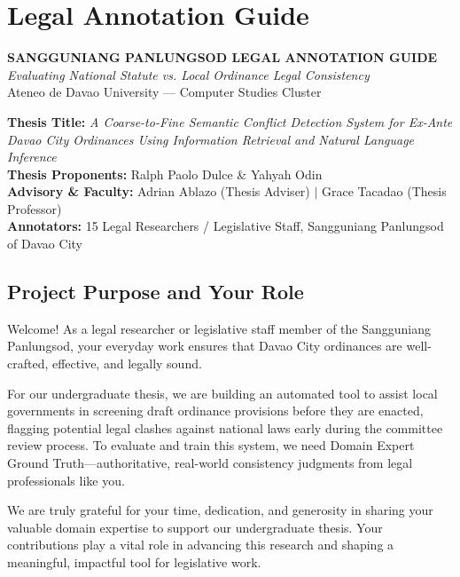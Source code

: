 \chapter{Legal Annotation Guide}
\label{app:annotator_guidebook}

\begin{center}
    \large\textbf{SANGGUNIANG PANLUNGSOD LEGAL ANNOTATION GUIDE}\\
    \normalsize\textit{Evaluating National Statute vs. Local Ordinance Legal Consistency}\\
    \small Ateneo de Davao University --- Computer Studies Cluster
\end{center}

\vspace{0.5em}
\noindent\textbf{Thesis Title:} \textit{A Coarse-to-Fine Semantic Conflict Detection System for Ex-Ante Davao City Ordinances Using Information Retrieval and Natural Language Inference}\\
\textbf{Thesis Proponents:} Ralph Paolo Dulce \& Yahyah Odin\\
\textbf{Advisory \& Faculty:} Adrian Ablazo (Thesis Adviser) $|$ Grace Tacadao (Thesis Professor)\\
\textbf{Annotators:} 15 Legal Researchers / Legislative Staff, Sangguniang Panlungsod of Davao City

\section{Project Purpose and Your Role}
\label{sec:app_guide_purpose}

Welcome! As a legal researcher or legislative staff member of the Sangguniang Panlungsod, your everyday work ensures that Davao City ordinances are well-crafted, effective, and legally sound. 

For our undergraduate thesis, we are building an automated tool to assist local governments in screening draft ordinance provisions before they are enacted, flagging potential legal clashes against national laws early during the committee review process. To evaluate and train this system, we need Domain Expert Ground Truth---authoritative, real-world consistency judgments from legal professionals like you.

We are truly grateful for your time, dedication, and generosity in sharing your valuable domain expertise to support our undergraduate thesis. Your contributions play a vital role in advancing this research and shaping a meaningful, impactful tool for legislative work.


